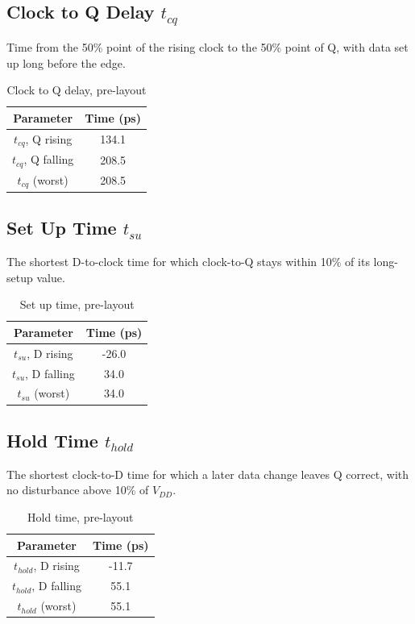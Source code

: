 \documentclass[conference,a4paper]{IEEEtran}
\begin{document}
\subsection{Clock to Q Delay $t_{cq}$}
Time from the 50\% point of the rising clock to the 50\% point of Q, with data set up long before the edge.

\begin{table}[H]\centering\footnotesize
\caption{Clock to Q delay, pre-layout}
\begin{tabular}{|c|c|}\hline
Parameter & Time (ps) \\ \hline
$t_{cq}$, Q rising & 134.1 \\ \hline
$t_{cq}$, Q falling & 208.5 \\ \hline
$t_{cq}$ (worst) & 208.5 \\ \hline
\end{tabular}
\end{table}

\subsection{Set Up Time $t_{su}$}
The shortest D-to-clock time for which clock-to-Q stays within 10\% of its long-setup value.

\begin{table}[H]\centering\footnotesize
\caption{Set up time, pre-layout}
\begin{tabular}{|c|c|}\hline
Parameter & Time (ps) \\ \hline
$t_{su}$, D rising & -26.0 \\ \hline
$t_{su}$, D falling & 34.0 \\ \hline
$t_{su}$ (worst) & 34.0 \\ \hline
\end{tabular}
\end{table}

\subsection{Hold Time $t_{hold}$}
The shortest clock-to-D time for which a later data change leaves Q correct, with no disturbance above 10\% of $V_{DD}$.

\begin{table}[H]\centering\footnotesize
\caption{Hold time, pre-layout}
\begin{tabular}{|c|c|}\hline
Parameter & Time (ps) \\ \hline
$t_{hold}$, D rising & -11.7 \\ \hline
$t_{hold}$, D falling & 55.1 \\ \hline
$t_{hold}$ (worst) & 55.1 \\ \hline
\end{tabular}
\end{table}
\end{document}
